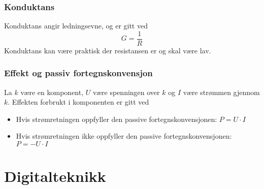 \documentclass{article}
\begin{document}
\subsubsection{Konduktans}
Konduktans angir ledningsevne, og er gitt ved
\[G = \frac{1}{R}\]
Konduktans kan være praktisk der resistansen er og skal være lav.


\subsubsection{Effekt og passiv fortegnskonvensjon}
La $k$ være en komponent, $U$ være spenningen over $k$ og $I$ være strømmen gjennom $k$. Effekten forbrukt i komponenten er gitt ved
\begin{itemize}
    \item Hvis strømretningen oppfyller den passive fortegnskonvensjonen: $P = U \cdot I$
    \item Hvis strømretningen ikke oppfyller den passive fortegnskonvensjonen: $P = - U \cdot I$
\end{itemize}





\section{Digitalteknikk}
\end{document}
